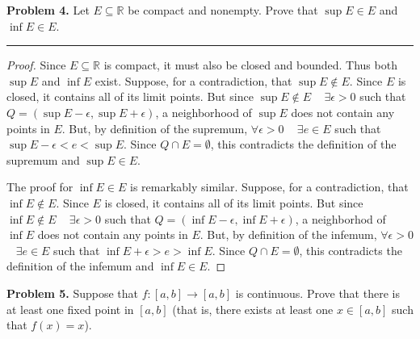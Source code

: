 \documentclass[leqno]{article}
\theoremstyle{nonumberplain}
\newtheorem{proof}{Proof}
\begin{document}
\pagebreak





\noindent\textbf{Problem 4.} Let $E \subseteq \mathbb{R}$ be compact and nonempty. Prove that $\sup E \in E$ and $\inf E \in E$.   

\noindent\rule[0.5ex]{\linewidth}{1pt}

\begin{proof}
	Since $E \subseteq \mathbb{R}$ is compact, it must also be closed and bounded.  Thus both $\sup E$ and $\inf E$ exist.  Suppose, for a contradiction, that $\sup E \notin E$.  Since $E$ is closed, it contains all of its limit points.  But since $\sup E \notin E$ ~ $\exists \epsilon >0$ such that $Q = (\sup E - \epsilon, \sup E + \epsilon)$, a neighborhood of $\sup E$ does not contain any points in $E$.  But, by definition of the supremum, $\forall \epsilon >0$ ~ $\exists e \in E$ such that $\sup E -\epsilon < e <\sup E$. Since $Q\cap E = \emptyset$, this contradicts the definition of the supremum and $\sup E \in E$.

	The proof for $\inf E \in E$ is remarkably similar.  Suppose, for a contradiction, that $\inf E \notin E$.  Since $E$ is closed, it contains all of its limit points.  But since $\inf E \notin E$ ~ $\exists \epsilon >0$ such that $Q=(\inf E -\epsilon, \inf E + \epsilon)$, a neighborhod of $\inf E$ does not contain any points in $E$.  But, by definition of the infemum, $\forall \epsilon >0$ ~ $\exists e \in E$ such that $\inf E + \epsilon >e>\inf E$.  Since $Q \cap E = \emptyset$, this contradicts the definition of the infemum and $\inf E \in E$. 
\end{proof}

\pagebreak




\noindent\textbf{Problem 5.} Suppose that $f \colon [a,b] \to [a,b]$ is continuous.  Prove that there is at least one fixed point in $[a,b]$ (that is, there exists at least one $x \in [a,b]$ such that $f(x)=x$).
\end{document}
